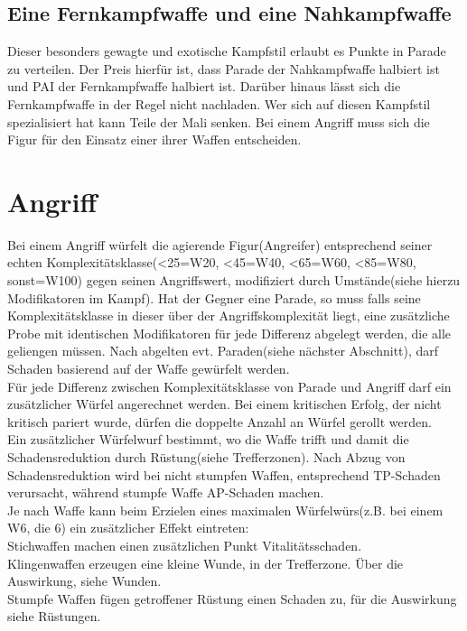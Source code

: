 \documentclass[a4paper,12pt,oneside]{book}
\begin{document}
\subsection{Eine Fernkampfwaffe und eine Nahkampfwaffe}
Dieser besonders gewagte und exotische Kampfstil erlaubt es Punkte in Parade zu verteilen. Der Preis hierfür ist, dass Parade der Nahkampfwaffe halbiert ist und PAI der Fernkampfwaffe halbiert ist. Darüber hinaus lässt
sich die Fernkampfwaffe in der Regel nicht nachladen. Wer sich auf diesen Kampfstil spezialisiert hat kann Teile der Mali senken. Bei einem Angriff muss sich die Figur für den Einsatz einer ihrer Waffen entscheiden.

\section{Angriff}
Bei einem Angriff würfelt die agierende Figur(Angreifer) entsprechend seiner echten Komplexitätsklasse(\textless25=W20, \textless45=W40, \textless65=W60, \textless85=W80, sonst=W100) gegen seinen Angriffswert, modifiziert durch Umstände(siehe hierzu Modifikatoren im Kampf). Hat der Gegner eine Parade, so muss falls seine Komplexitätsklasse in dieser über der Angriffskomplexität liegt, eine zusätzliche Probe mit identischen Modifikatoren für jede Differenz abgelegt werden, die alle geliengen müssen.
Nach abgelten evt. Paraden(siehe nächster Abschnitt), darf Schaden basierend auf der Waffe gewürfelt werden.
\\Für jede Differenz zwischen Komplexitätsklasse von Parade und Angriff darf ein zusätzlicher Würfel angerechnet werden. Bei einem kritischen Erfolg, der nicht kritisch pariert wurde, dürfen die doppelte Anzahl an Würfel gerollt werden.
\\Ein zusätzlicher Würfelwurf bestimmt, wo die Waffe trifft und damit die Schadensreduktion durch Rüstung(siehe Trefferzonen). Nach Abzug von Schadensreduktion wird bei nicht stumpfen Waffen, entsprechend TP-Schaden verursacht, während stumpfe Waffe AP-Schaden machen.
\\Je nach Waffe kann beim Erzielen eines maximalen Würfelwürs(z.B. bei einem W6, die 6) ein zusätzlicher Effekt eintreten:
\\Stichwaffen machen einen zusätzlichen Punkt Vitalitätsschaden.
\\Klingenwaffen erzeugen eine kleine Wunde, in der Trefferzone. Über die Auswirkung, siehe Wunden. 
\\Stumpfe Waffen fügen getroffener Rüstung einen Schaden zu, für die Auswirkung siehe Rüstungen.
\end{document}
